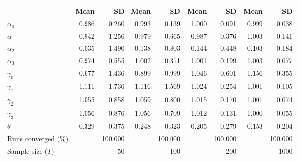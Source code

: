 
\begin{tabular}[t]{lrrrrrrrr}
\toprule
  & Mean & SD & Mean  & SD  & Mean   & SD   & Mean    & SD   \\
\midrule
$\alpha_{0}$ & 0.986 & 0.260 & 0.993 & 0.139 & 1.000 & 0.091 & 0.999 & 0.038\\
$\alpha_{1}$ & 0.942 & 1.256 & 0.979 & 0.665 & 0.987 & 0.376 & 1.003 & 0.141\\
$\alpha_{2}$ & 0.035 & 1.490 & 0.138 & 0.803 & 0.144 & 0.448 & 0.103 & 0.184\\
$\alpha_{3}$ & 0.974 & 0.555 & 1.002 & 0.311 & 1.001 & 0.199 & 1.003 & 0.077\\
$\gamma_{0}$ & 0.677 & 1.436 & 0.899 & 0.999 & 1.046 & 0.601 & 1.156 & 0.355\\
$\gamma_{1}$ & 1.111 & 1.736 & 1.116 & 1.569 & 1.024 & 0.254 & 1.001 & 0.105\\
$\gamma_{2}$ & 1.055 & 0.858 & 1.059 & 0.800 & 1.015 & 0.170 & 1.001 & 0.074\\
$\gamma_{3}$ & 1.056 & 0.876 & 1.056 & 0.709 & 1.012 & 0.131 & 1.000 & 0.055\\
$\theta$ & 0.329 & 0.375 & 0.248 & 0.323 & 0.205 & 0.279 & 0.153 & 0.204\\
Runs converged (\%) &  & 100.000 &  & 100.000 &  & 100.000 &  & 100.000\\
Sample size ($T$) &  & 50 &  & 100 &  & 200 &  & 1000\\
\bottomrule
\end{tabular}

